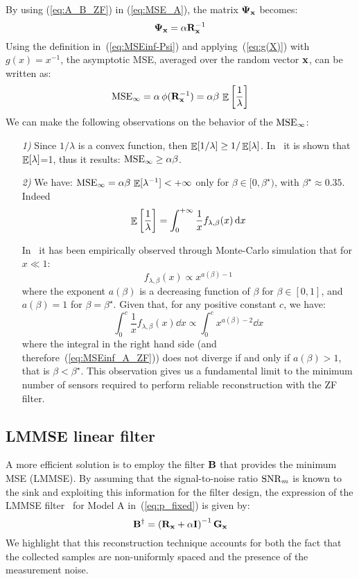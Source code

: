 \documentclass[final, a4paper]{IEEEtran}
\newcommand{\xv}{{\bf x}}
\newcommand{\Bm}{{\bf B}}
\newcommand{\Gm}{{\bf G}}
\newcommand{\Id}{{\bf I}}
\newcommand{\Rm}{{\bf R}}
\newcommand{\Psim}{\hbox{\boldmath$\Psi$}}
\def\MSEinf{{\rm MSE}_{\infty}}
\begin{document}
By using (\ref{eq:A_B_ZF}) in (\ref{eq:MSE_A}), the matrix $\Psim_\xv$ becomes:
\begin{equation}
\Psim_\xv = \alpha\Rm_\xv^{-1}
\label{eq:MSE_A_ZF}
\end{equation}
Using the definition in~(\ref{eq:MSEinf-Psi}) and applying~(\ref{eq:g(X)})
with $g(x)=x^{-1}$, the asymptotic MSE,
averaged over the random vector $\xv$, can be written as:
\begin{equation}
\MSEinf = \alpha\,\phi(\Rm_\xv^{-1}) = \alpha\beta\,\EE\left[\frac{1}{\lambda}\right]
\label{eq:MSEinf_A_ZF}
\end{equation}
We can make the following observations on the behavior of the $\MSEinf$:
\begin{itemize}
\item[{\em 1)}] Since $1/\lambda$ is a convex function, then $\mathop{\mathbb{E}}\limits[1/\lambda] \ge 1/\mathop{\mathbb{E}}\limits[\lambda]$.
In~\cite{NordioChiasseriniViterbo} it is shown that $\mathop{\mathbb{E}}\limits[\lambda]$=1, thus it results: $\MSEinf \ge \alpha\beta$.

\item[{\em 2)}] We have:
$\MSEinf =\alpha\beta\, \EE[\lambda^{-1}]<+\infty$ only for $\beta \in [0,\beta^\star)$, with $\beta^\star \approx 0.35$.
Indeed
\[ \mathop{\mathbb{E}}\limits\left[\frac{1}{\lambda}\right] = \int_0^{+\infty} \frac{1}{x} f_{\lambda,\beta}(x) {\rm\,d} x \]


In~\cite{NordioChiasseriniViterbo} it has been  empirically observed through Monte-Carlo simulation
that for $x \ll 1$:
\[ f_{\lambda,\beta}(x)  \propto x^{a(\beta)-1} \]
where the exponent $a(\beta)$ is a decreasing function of $\beta$ for
$\beta\in [0,1]$, and $a(\beta)=1$ for $\beta=\beta^\star$.
Given that, for any positive constant $c$, we have:
\[ \int_0^c \frac{1}{x} f_{\lambda,\beta}(x) \dd x \propto \int_0^c x^{a(\beta)-2} \dd x \]
where the integral in the right hand side (and
therefore~(\ref{eq:MSEinf_A_ZF})) does not diverge if and only if
$a(\beta)>1$, that is $\beta<\beta^{\star}$. This observation gives
us a fundamental limit to the minimum number of sensors required to
perform reliable reconstruction with the ZF filter.
\end{itemize}


\subsection{LMMSE linear filter}
\label{sec:A_LMMSE}
A more efficient solution is to employ the filter $\Bm$ that provides the
minimum MSE (LMMSE).
By assuming that the signal-to-noise ratio ${\rm SNR}_m$ is known to the sink and exploiting
this information for the filter design,
the expression of the LMMSE filter~\cite{Verdu_book} for
Model A in~(\ref{eq:p_fixed}) is given by:
\begin{equation}
\Bm\Herm =\left(\Rm_\xv +\alpha\Id\right)^{-1} \Gm_\xv
\label{eq:A_B_LMMSE}
\end{equation}
We highlight that this reconstruction technique accounts for both the fact that
the collected samples are non-uniformly spaced and the presence of the measurement noise.
\end{document}
